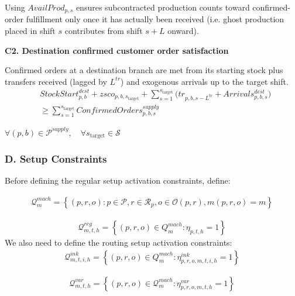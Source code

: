 \documentclass{article}
\begin{document}
Using $AvailProd_{p,s}$ ensures subcontracted production counts toward confirmed-order fulfillment only once it has actually been received (i.e. ghost production placed in shift $s$ contributes from shift $s+L$ onward).

\noindent\textbf{C2. Destination confirmed customer order satisfaction}

Confirmed orders at a destination branch are met from its starting stock plus transfers received (lagged by $L^{tr}$) and exogenous arrivals up to the target shift.
\begin{align}
&
StockStart^{dest}_{p,b}
+
zsco_{p,b,s_{\text{target}}}
+
\sum_{s=1}^{s_{\text{target}}}
\big( tr_{p,b,s-L^{tr}} + Arrivals^{dest}_{p,b,s} \big)
\nonumber \\
&\ge
\sum_{s=1}^{s_{\text{target}}}
ConfirmedOrders^{supply}_{p,b,s}
\label{eq:C2_dest_confirmed_orders}
\end{align}
\begin{center}
$\forall (p,b) \in \mathcal{P}^{supply}, \quad
\forall s_{\text{target}} \in \mathcal{S}$
\end{center}



\noindent\text{---------------------------------------------------------------------------------------------------------}

\subsubsection*{D. Setup Constraints}

Before defining the regular setup activation constraints, define:

\begin{align}
\mathcal{Q}^{mach}_{m}
=
\left\{
(p,r,o):
p \in \mathcal{P},
r \in \mathcal{R}_p,
o \in \mathcal{O}(p,r),
m(p,r,o)=m
\right\}
\end{align}

\begin{align}
\mathcal{Q}^{reg}_{m,t,h}
=
\left\{
(p,r,o)
\in {Q}^{mach}_{m}:
\eta_{p,t,h}=1
\right\}
\end{align}
We also need to define the routing setup activation constraints:
\begin{align}
\mathcal{Q}^{ink}_{m,t,i,h}
=
\left\{
(p,r,o)
\in {Q}^{mach}_{m}:
\eta^{ink}_{p,r,o,m,t,i,h}=1
\right\}
\end{align}

\begin{align}
\mathcal{Q}^{var}_{m,t,h}
=
\left\{
(p,r,o)
\in \mathcal{Q}^{mach}_{m}:
\eta^{var}_{p,r,o,m,t,h}=1
\right\}
\end{align}
\end{document}
